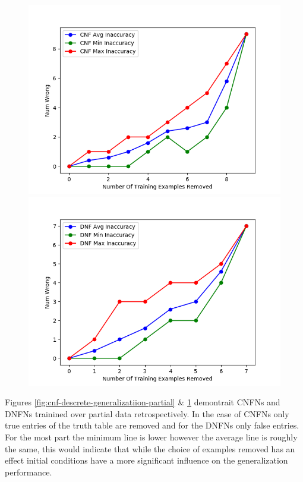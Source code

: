 \begin{figure}[H]
	\centering
	\begin{minipage}[b]{0.45\textwidth}
		\includegraphics[width=\textwidth]{cnf-descrete-generalization-partial.png}
		\caption{}
		\label{fig:cnf-descrete-generalizatiion-partial}
	\end{minipage}
	\begin{minipage}[b]{0.45\textwidth}
		\includegraphics[width=\textwidth]{dnf-descrete-generalization-partial.png}
		\caption{}
		\label{fig:dnf-descrete-generalizatiion-partial}
	\end{minipage}
	\hfill
\end{figure}

Figures \ref{fig:cnf-descrete-generalizatiion-partial} \& \ref{fig:dnf-descrete-generalizatiion-partial} demontrait CNFNs and DNFNs trainined over partial data retrospectively. In the case of CNFNs only true entries of the truth table are removed and for the DNFNs only false entries. For the most part the minimum line is lower however the average line is roughly the same, this would indicate that while the choice of examples removed has an effect  initial conditions have a more significant influence on the generalization performance.

